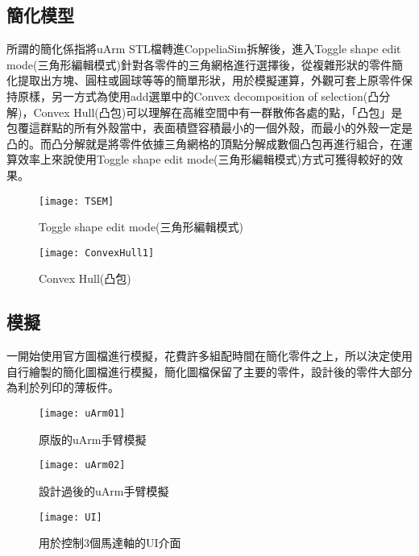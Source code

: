 \subsection{簡化模型}
 所謂的簡化係指將uArm STL檔轉進CoppeliaSim拆解後，進入Toggle shape edit mode(三角形編輯模式)針對各零件的三角網格進行選擇後，從複雜形狀的零件簡化提取出方塊、圓柱或圓球等等的簡單形狀，用於模擬運算，外觀可套上原零件保持原樣，另一方式為使用add選單中的Convex decomposition of selection(凸分解)，Convex Hull(凸包)可以理解在高維空間中有一群散佈各處的點，「凸包」是包覆這群點的所有外殼當中，表面積暨容積最小的一個外殼，而最小的外殼一定是凸的。而凸分解就是將零件依據三角網格的頂點分解成數個凸包再進行組合，在運算效率上來說使用Toggle shape edit mode(三角形編輯模式)方式可獲得較好的效果。\\
 
\begin{figure}[hbt!]
\begin{center}
\texttt{[image: TSEM]}
\caption{\Large Toggle shape edit mode(三角形編輯模式)}\label{TSEM}
\end{center}
\end{figure}

\begin{figure}[hbt!]
\begin{center}
\texttt{[image: ConvexHull1]}
\caption{\Large Convex Hull(凸包)}\label{ConvexHull1}
\end{center}
\end{figure}

\subsection{模擬}
 一開始使用官方圖檔進行模擬，花費許多組配時間在簡化零件之上，所以決定使用自行繪製的簡化圖檔進行模擬，簡化圖檔保留了主要的零件，設計後的零件大部分為利於列印的薄板件。\\
\begin{figure}[hbt!]
\begin{center}
\texttt{[image: uArm01]}
\caption{\Large 原版的uArm手臂模擬}\label{uArm01}
\end{center}
\end{figure}
\begin{figure}[hbt!]
\begin{center}
\texttt{[image: uArm02]}
\caption{\Large 設計過後的uArm手臂模擬}\label{uArm02}
\end{center}
\end{figure}
\begin{figure}[hbt!]
\begin{center}
\texttt{[image: UI]}
\caption{\Large 用於控制3個馬達軸的UI介面}\label{UI}
\end{center}
\end{figure}
\newpage

